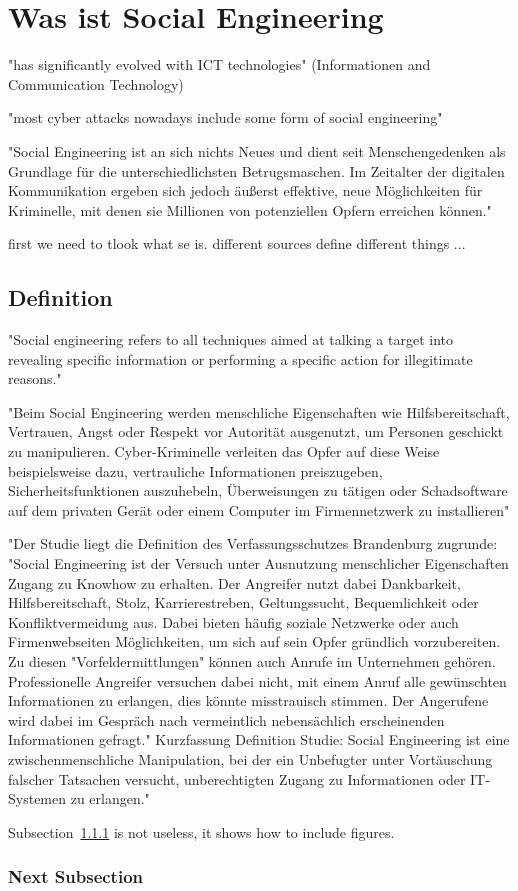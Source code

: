 \chapter{Was ist Social Engineering}

"has significantly evolved with ICT technologies"\cite{1_enisa}
(Informationen and Communication Technology)

"most cyber attacks nowadays include some form of social engineering"\cite{1_enisa}

"Social Engineering ist an sich nichts Neues und dient seit Menschengedenken als Grundlage
für die unterschiedlichsten Betrugsmaschen. Im Zeitalter der digitalen Kommunikation ergeben
sich jedoch äußerst effektive, neue Möglichkeiten für Kriminelle, mit denen sie Millionen von
potenziellen Opfern erreichen können."\cite{2_bsi}

first we need to tlook what se is. different sources define different things ...

\section{Definition}

"Social engineering refers to all techniques aimed at talking a target into revealing specific information or performing a
specific action for illegitimate reasons."\cite{1_enisa}

"Beim Social Engineering werden menschliche Eigenschaften wie Hilfsbereitschaft, Vertrauen, Angst oder Respekt vor Autorität
ausgenutzt, um Personen geschickt zu manipulieren. Cyber-Kriminelle verleiten das Opfer auf diese Weise beispielsweise dazu,
vertrauliche Informationen preiszugeben, Sicherheitsfunktionen auszuhebeln, Überweisungen zu tätigen oder Schadsoftware auf dem
privaten Gerät oder einem Computer im Firmennetzwerk zu installieren"\cite{2_bsi}

"Der Studie liegt die Definition des Verfassungsschutzes Brandenburg zugrunde: "Social Engineering ist der Versuch unter Ausnutzung menschlicher Eigenschaften Zugang zu Knowhow zu erhalten. Der Angreifer nutzt dabei Dankbarkeit, Hilfsbereitschaft, Stolz, Karrierestreben, Geltungssucht, Bequemlichkeit oder Konfliktvermeidung aus. Dabei bieten häufig soziale Netzwerke oder auch Firmenwebseiten Möglichkeiten, um sich auf sein Opfer gründlich
vorzubereiten. Zu diesen "Vorfeldermittlungen" können auch Anrufe im Unternehmen gehören. Professionelle Angreifer versuchen dabei nicht, mit einem Anruf alle gewünschten Informationen zu erlangen, dies könnte misstrauisch stimmen. Der Angerufene wird dabei im
Gespräch nach vermeintlich nebensächlich erscheinenden Informationen gefragt." Kurzfassung Definition Studie: Social Engineering ist eine zwischenmenschliche Manipulation, bei
der ein Unbefugter unter Vortäuschung falscher Tatsachen versucht, unberechtigten Zugang
zu Informationen oder IT-Systemen zu erlangen."\cite{10_bka}

Subsection~\ref{next_subsection} is not useless, it shows how to include figures.


\subsection{Next Subsection}
\label{next_subsection}

